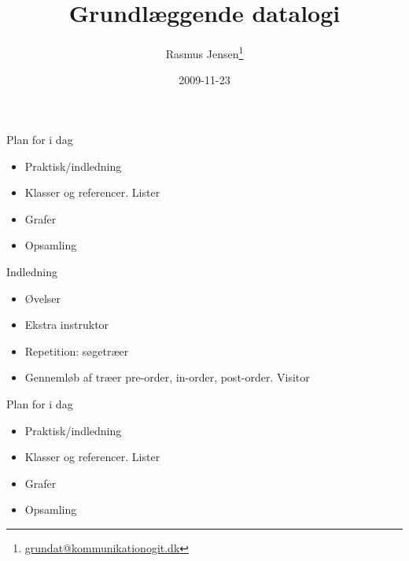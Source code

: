 \documentclass[a4paper,landscape]{slides}
\title{Grundlæggende datalogi}
\author{Rasmus Jensen\footnote{\url{grundat@kommunikationogit.dk}}}
\date{2009-11-23}
\begin{document}
\maketitle

\begin{slide}
	\begin{center} {\large 
            Plan for i dag
	} \end{center}
	\begin{itemize} \addtolength{\itemsep}{-\baselineskip}
            \item Praktisk/indledning
            \item Klasser og referencer. Lister
            \item Grafer
            \item Opsamling 
	\end{itemize}
\end{slide}


\begin{slide}
	\begin{center} {\large 
      Indledning
	} \end{center}
	\begin{itemize} \addtolength{\itemsep}{-\baselineskip}
      \item     Øvelser
      \item     Ekstra instruktor
      \item     Repetition: søgetræer
      \item     Gennemløb af træer pre-order, in-order, post-order. Visitor
	\end{itemize}
\end{slide}



\begin{slide}
	\begin{center} {\large 
            Plan for i dag
	} \end{center}
	\begin{itemize} \addtolength{\itemsep}{-\baselineskip}
            \item Praktisk/indledning
            \item Klasser og referencer. Lister
            \item Grafer
            \item Opsamling 
	\end{itemize}
\end{slide}
\end{document}
